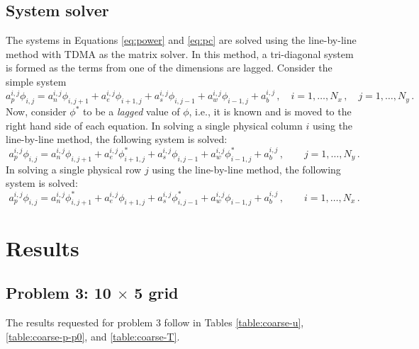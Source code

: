 \documentclass{article}
\begin{document}
\subsection{System solver}

The systems in Equations  \eqref{eq:power} and \eqref{eq:pc} are solved using the line-by-line method with TDMA as the matrix solver. In this method, a tri-diagonal system is formed as the terms from one of the dimensions are lagged. Consider the simple system
\begin{equation}
a_p^{i,j} \phi_{i,j} = a_n^{i,j} \phi_{i,j+1} + a_e^{i,j} \phi_{i+1,j} + a_s^{i,j} \phi_{i,j-1} + a_w^{i,j} \phi_{i-1,j} + a_b^{i,j}\,, \quad i = 1, \ldots, N_x\,, \quad j = 1, \ldots, N_y\,.
\end{equation}
Now, consider $\phi^*$ to be a \textit{lagged} value of $\phi$, i.e., it is known and is moved to the right hand side of each equation. In solving a single physical column $i$ using the line-by-line method, the following system is solved:
\begin{equation}
a_p^{i,j} \phi_{i,j} = a_n^{i,j} \phi_{i,j+1} + a_e^{i,j} \phi^*_{i+1,j} + a_s^{i,j} \phi_{i,j-1} + a_w^{i,j} \phi^*_{i-1,j} + a_b^{i,j}\,, \quad \quad j = 1, \ldots, N_y\,.
\end{equation}
In solving a single physical row $j$ using the line-by-line method, the following system is solved:
\begin{equation}
a_p^{i,j} \phi_{i,j} = a_n^{i,j} \phi^*_{i,j+1} + a_e^{i,j} \phi_{i+1,j} + a_s^{i,j} \phi^*_{i,j-1} + a_w^{i,j} \phi_{i-1,j} + a_b^{i,j}\,, \quad \quad i = 1, \ldots, N_x\,.
\end{equation}

\section{Results}

\subsection{Problem 3: 10 $\times$ 5 grid}

The results requested for problem 3 follow in Tables \ref{table:coarse-u}, \ref{table:coarse-p-p0}, and \ref{table:coarse-T}.
\end{document}
